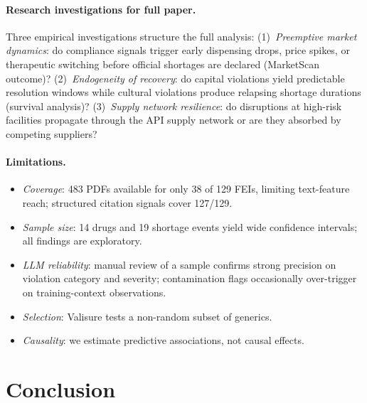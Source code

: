 \documentclass[12pt]{article}
\begin{document}
\paragraph{Research investigations for full paper.}
Three empirical investigations structure the full analysis:
(1)~\emph{Preemptive market dynamics}: do compliance signals trigger early
dispensing drops, price spikes, or therapeutic switching before official
shortages are declared (MarketScan outcome)?
(2)~\emph{Endogeneity of recovery}: do capital violations yield predictable
resolution windows while cultural violations produce relapsing shortage durations
(survival analysis)?
(3)~\emph{Supply network resilience}: do disruptions at high-risk facilities
propagate through the API supply network or are they absorbed by competing
suppliers?

\paragraph{Limitations.}
\begin{itemize}[noitemsep]
  \item \textit{Coverage}: 483 PDFs available for only 38 of 129 FEIs, limiting
        text-feature reach; structured citation signals cover 127/129.
  \item \textit{Sample size}: 14 drugs and 19 shortage events yield wide
        confidence intervals; all findings are exploratory.
  \item \textit{LLM reliability}: manual review of a sample confirms strong
        precision on violation category and severity; contamination flags
        occasionally over-trigger on training-context observations.
  \item \textit{Selection}: Valisure tests a non-random subset of generics.
  \item \textit{Causality}: we estimate predictive associations, not causal effects.
\end{itemize}

\section{Conclusion}
\label{sec:conclusion}
\end{document}
